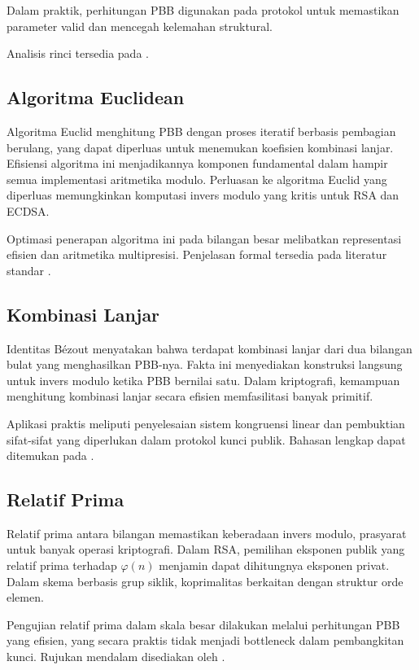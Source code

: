 \documentclass[../main.tex]{subfiles}
\begin{document}
Dalam praktik, perhitungan PBB digunakan pada protokol untuk memastikan parameter valid dan mencegah kelemahan struktural.

Analisis rinci tersedia pada \textcite{menezes1996handbook}.

\subsection{Algoritma Euclidean}
Algoritma Euclid menghitung PBB dengan proses iteratif berbasis pembagian berulang, yang dapat diperluas untuk menemukan koefisien kombinasi lanjar. Efisiensi algoritma ini menjadikannya komponen fundamental dalam hampir semua implementasi aritmetika modulo. Perluasan ke algoritma Euclid yang diperluas memungkinkan komputasi invers modulo yang kritis untuk RSA dan ECDSA.

Optimasi penerapan algoritma ini pada bilangan besar melibatkan representasi efisien dan aritmetika multipresisi. Penjelasan formal tersedia pada literatur standar \parencite{menezes1996handbook}.

\subsection{Kombinasi Lanjar}
Identitas Bézout menyatakan bahwa terdapat kombinasi lanjar dari dua bilangan bulat yang menghasilkan PBB-nya. Fakta ini menyediakan konstruksi langsung untuk invers modulo ketika PBB bernilai satu. Dalam kriptografi, kemampuan menghitung kombinasi lanjar secara efisien memfasilitasi banyak primitif.

Aplikasi praktis meliputi penyelesaian sistem kongruensi linear dan pembuktian sifat-sifat yang diperlukan dalam protokol kunci publik. Bahasan lengkap dapat ditemukan pada \textcite{menezes1996handbook}.

\subsection{Relatif Prima}
Relatif prima antara bilangan memastikan keberadaan invers modulo, prasyarat untuk banyak operasi kriptografi. Dalam RSA, pemilihan eksponen publik yang relatif prima terhadap \(\varphi(n)\) menjamin dapat dihitungnya eksponen privat. Dalam skema berbasis grup siklik, koprimalitas berkaitan dengan struktur orde elemen.

Pengujian relatif prima dalam skala besar dilakukan melalui perhitungan PBB yang efisien, yang secara praktis tidak menjadi bottleneck dalam pembangkitan kunci. Rujukan mendalam disediakan oleh \textcite{menezes1996handbook}.
\end{document}
